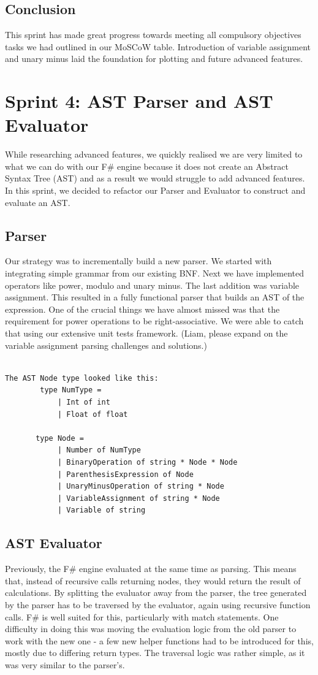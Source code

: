 \documentclass[a4paper, oneside, 11pt]{report}
\begin{document}
\subsection{Conclusion}
This sprint has made great progress towards meeting all compulsory objectives tasks we had outlined in our MoSCoW table. Introduction of variable assignment and unary minus laid the foundation for plotting and future advanced features.



\section{Sprint 4: AST Parser and AST Evaluator}
While researching advanced features, we quickly realised we are very limited to what we can do with our F\# engine because it does not create an Abstract Syntax Tree (AST) and as a result we would struggle to add advanced features. In this sprint, we decided to refactor our Parser and Evaluator to construct and evaluate an AST.

\subsection{Parser}
Our strategy was to incrementally build a new parser. We started with integrating simple grammar from our existing BNF. Next we have implemented operators like power, modulo and unary minus. The last addition was variable assignment. This resulted in a fully functional parser that builds an AST of the expression. One of the crucial things we have almost missed was that the requirement for power operations to be right-associative. We were able to catch that using our extensive unit tests framework.
(Liam, please expand on the variable assignment parsing challenges and solutions.)
\begin{verbatim}
    
The AST Node type looked like this:
        type NumType =
            | Int of int
            | Float of float

       type Node =
            | Number of NumType
            | BinaryOperation of string * Node * Node
            | ParenthesisExpression of Node
            | UnaryMinusOperation of string * Node
            | VariableAssignment of string * Node
            | Variable of string
\end{verbatim}
\subsection{AST Evaluator}
Previously, the F\# engine evaluated at the same time as parsing. This means that, instead of recursive calls returning nodes, they would return the result of calculations. By splitting the evaluator away from the parser, the tree generated by the parser has to be traversed by the evaluator, again using recursive function calls. F\# is well suited for this, particularly with match statements.
One difficulty in doing this was moving the evaluation logic from the old parser to work with the new one - a few new helper functions had to be introduced for this, mostly due to differing return types. The traversal logic was rather simple, as it was very similar to the parser's.
\end{document}
